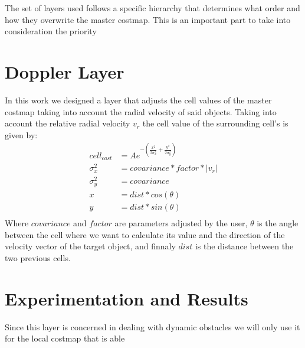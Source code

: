 The set of layers used follows a specific hierarchy that determines what order and how they overwrite the master costmap. This is an important part to take into consideration the priority


\section{Doppler Layer}
In this work we designed a layer that adjusts the cell values of the master costmap taking into account the radial velocity of said objects. Taking into account the relative  radial velocity $v_r$ the cell value of the surrounding cell's is given by:
\begin{equation} \label{eq1}
\begin{split}
cell_{cost} & = A e^{-(\frac{x^2}{2 \sigma_x^2}+\frac{y^2}{2 \sigma_y^2})} \\
 \sigma_x^2 & = covariance * factor * |v_r| \\
 \sigma_y^2 & = covariance \\
 x & =dist *cos(\theta)\\
 y & =dist *sin(\theta)\\
\end{split}
\end{equation}
Where $covariance$ and $factor$ are parameters adjusted by the user, $\theta$ is the angle between the cell where we want to calculate its value and the direction of the velocity vector of the target object, and finnaly $dist$ is the distance between the two previous cells.
\section{Experimentation and Results}
Since this layer is concerned in dealing with dynamic obstacles we will only use it for the local costmap that is able 





